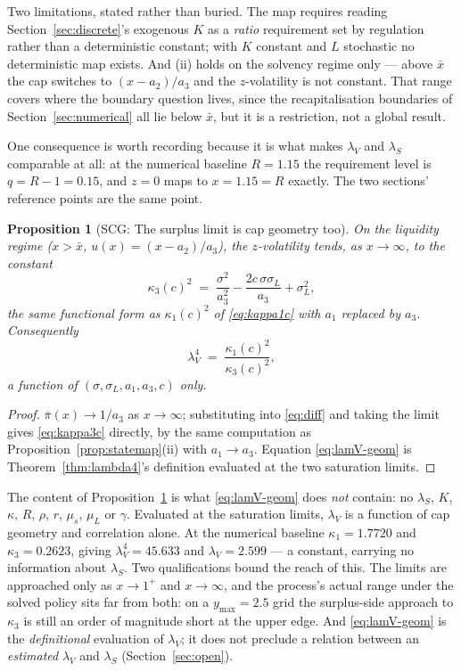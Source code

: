 \documentclass[11pt]{article}
\newtheorem{proposition}{Proposition}
\theoremstyle{remark}
\begin{document}
\noindent
Two limitations, stated rather than buried. The map requires reading
Section~\ref{sec:discrete}'s exogenous $K$ as a \emph{ratio} requirement
set by regulation rather than a deterministic constant; with $K$ constant
and $L$ stochastic no deterministic map exists. And (ii) holds on the
solvency regime only --- above $\bar x$ the cap switches to
$(x-a_2)/a_3$ and the $z$-volatility is not constant. That range covers
where the boundary question lives, since the recapitalisation boundaries
of Section~\ref{sec:numerical} all lie below $\bar x$, but it is a
restriction, not a global result.

\medskip\noindent
One consequence is worth recording because it is what makes $\lambda_V$
and $\lambda_S$ comparable at all: at the numerical baseline $R=1.15$ the
requirement level is $q = R-1 = 0.15$, and $z=0$ maps to $x=1.15=R$
exactly. The two sections' reference points are the same point.

\begin{proposition}[SCG: The surplus limit is cap geometry too]
\label{prop:satlimits}
On the liquidity regime ($x>\bar x$, $u(x) = (x-a_2)/a_3$), the
$z$-volatility tends, as $x\to\infty$, to the constant
\begin{equation}
\kappa_3(c)^2 \;=\; \frac{\sigma^2}{a_3^2} - \frac{2c\,\sigma\sigma_L}{a_3}
+ \sigma_L^2 ,
\label{eq:kappa3c}
\end{equation}
the same functional form as $\kappa_1(c)^2$ of \eqref{eq:kappa1c} with
$a_1$ replaced by $a_3$. Consequently
\begin{equation}
\lambda_V^4 \;=\; \frac{\kappa_1(c)^2}{\kappa_3(c)^2},
\label{eq:lamV-geom}
\end{equation}
a function of $(\sigma,\sigma_L,a_1,a_3,c)$ only.
\end{proposition}
\begin{proof}
$\bar\pi(x) \to 1/a_3$ as $x\to\infty$; substituting into
\eqref{eq:diff} and taking the limit gives \eqref{eq:kappa3c} directly,
by the same computation as Proposition~\ref{prop:statemap}(ii) with
$a_1\to a_3$. Equation \eqref{eq:lamV-geom} is Theorem~\ref{thm:lambda4}'s
definition evaluated at the two saturation limits.
\end{proof}

\noindent
The content of Proposition~\ref{prop:satlimits} is what
\eqref{eq:lamV-geom} does \emph{not} contain: no $\lambda_S$, $K$,
$\kappa$, $R$, $\rho$, $r$, $\mu_s$, $\mu_L$ or $\gamma$. Evaluated at the
saturation limits, $\lambda_V$ is a function of cap geometry and
correlation alone. At the numerical baseline $\kappa_1=1.7720$ and
$\kappa_3=0.2623$, giving $\lambda_V^4 = 45.633$ and $\lambda_V=2.599$
--- a constant, carrying no information about $\lambda_S$. Two
qualifications bound the reach of this. The limits are approached only as
$x\to1^+$ and $x\to\infty$, and the process's actual range under the
solved policy sits far from both: on a $y_{\max}=2.5$ grid the
surplus-side approach to $\kappa_3$ is still an order of magnitude short
at the upper edge. And \eqref{eq:lamV-geom} is the \emph{definitional}
evaluation of $\lambda_V$; it does not preclude a relation between an
\emph{estimated} $\lambda_V$ and $\lambda_S$ (Section~\ref{sec:open}).
\end{document}
